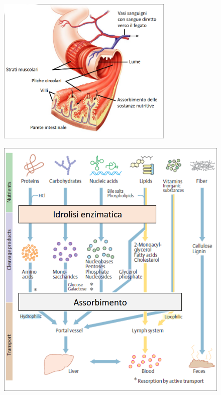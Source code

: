 \documentclass[a4paper]{article}
\begin{document}
\begin{figure}[th]
    \centering
    \includegraphics[width=0.75\textwidth]{./intestino.png}
\end{figure}

\pagebreak

\begin{figure}[th]
    \centering
    \includegraphics[width=\textwidth]{./assorbimento.png}
\end{figure}
\end{document}
